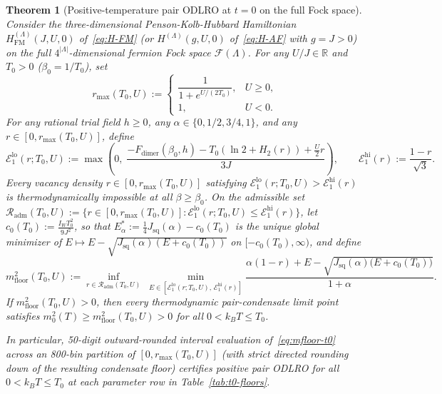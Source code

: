 \documentclass[11pt]{article}
\newtheorem{theorem}{Theorem}[section]
\theoremstyle{definition}
\theoremstyle{remark}
\newcommand{\calF}{\mathcal{F}}
\newcommand{\calE}{\mathcal{E}}
\newcommand{\bbR}{\mathbb{R}}
\begin{document}
\begin{theorem}[Positive-temperature pair ODLRO at $t = 0$ on the full Fock space]\label{thm:t0}
Consider the three-dimensional Penson-Kolb-Hubbard Hamiltonian $H_{\mathrm{FM}}^{(\Lambda)}(J, U, 0)$ of~\eqref{eq:H-FM} (or $H^{(\Lambda)}(g, U, 0)$ of~\eqref{eq:H-AF} with $g = J > 0$) on the full $4^{|\Lambda|}$-dimensional fermion Fock space $\calF(\Lambda)$. For any $U/J \in \bbR$ and $T_0 > 0$ ($\beta_0 = 1/T_0$), set
\begin{equation}\label{eq:rmax-def}
r_{\max}(T_0, U) := \begin{cases} \dfrac{1}{1 + e^{U/(2T_0)}}, & U \ge 0,\\[1ex] 1, & U < 0. \end{cases}
\end{equation}
For any rational trial field $h \ge 0$, any $\alpha \in \{0, 1/2, 3/4, 1\}$, and any $r \in [0, r_{\max}(T_0, U)]$, define
\begin{equation}\label{eq:E1-bounds-t0}
\calE_1^{\mathrm{lo}}(r; T_0, U) := \max\!\left(0,\; \frac{-F_{\mathrm{dimer}}(\beta_0, h) - T_0(\ln 2 + H_2(r)) + \frac{U}{2}r}{3J}\right), \qquad \calE_1^{\mathrm{hi}}(r) := \frac{1 - r}{\sqrt{3}}.
\end{equation}
Every vacancy density $r \in [0, r_{\max}(T_0, U)]$ satisfying $\calE_1^{\mathrm{lo}}(r; T_0, U) > \calE_1^{\mathrm{hi}}(r)$ is thermodynamically impossible at all $\beta \ge \beta_0$. On the admissible set $\mathcal{R}_{\mathrm{adm}}(T_0, U) := \{r \in [0, r_{\max}(T_0, U)] : \calE_1^{\mathrm{lo}}(r; T_0, U) \le \calE_1^{\mathrm{hi}}(r)\}$, let $c_0(T_0) := \frac{I_W T_0^2}{9J^2}$, so that $E_\alpha^* := \frac{1}{4}J_{\mathrm{sq}}(\alpha) - c_0(T_0)$ is the unique global minimizer of $E \mapsto E - \sqrt{J_{\mathrm{sq}}(\alpha)(E + c_0(T_0))}$ on $[-c_0(T_0), \infty)$, and define
\begin{equation}\label{eq:mfloor-t0}
m_{\mathrm{floor}}^2(T_0, U) := \inf_{r \in \mathcal{R}_{\mathrm{adm}}(T_0, U)} \;\min_{E \in [\calE_1^{\mathrm{lo}}(r; T_0, U),\, \calE_1^{\mathrm{hi}}(r)]} \frac{\alpha(1 - r) + E - \sqrt{J_{\mathrm{sq}}(\alpha)\bigl(E + c_0(T_0)\bigr)}}{1 + \alpha}.
\end{equation}
If $m_{\mathrm{floor}}^2(T_0, U) > 0$, then every thermodynamic pair-condensate limit point satisfies $m_0^2(T) \ge m_{\mathrm{floor}}^2(T_0, U) > 0$ for \emph{all} $0 < k_B T \le T_0$.

In particular, 50-digit outward-rounded interval evaluation of~\eqref{eq:mfloor-t0} across an 800-bin partition of $[0, r_{\max}(T_0, U)]$ (with strict directed rounding down of the resulting condensate floor) certifies positive pair ODLRO for all $0 < k_B T \le T_0$ at each parameter row in Table~\ref{tab:t0-floors}.
\end{theorem}
\end{document}
